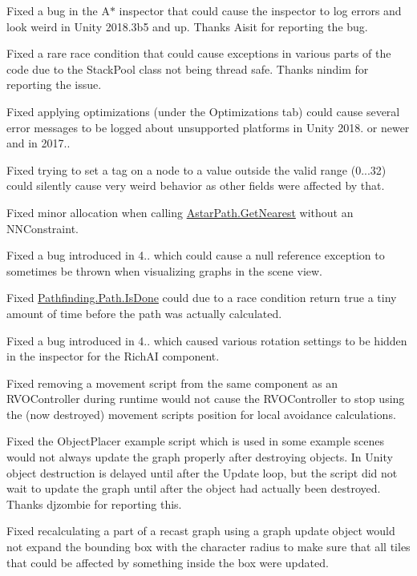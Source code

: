 \begin{DoxyItemize}
\begin{DoxyItemize}
\begin{DoxyItemize}
\item Fixed a bug in the A$\ast$ inspector that could cause the inspector to log errors and look weird in Unity 2018.\+3b5 and up. Thanks Aisit for reporting the bug.
\item Fixed a rare race condition that could cause exceptions in various parts of the code due to the Stack\+Pool class not being thread safe. Thanks nindim for reporting the issue.
\item Fixed applying optimizations (under the Optimizations tab) could cause several error messages to be logged about unsupported platforms in Unity 2018. or newer and in 2017..
\item Fixed trying to set a tag on a node to a value outside the valid range (0...32) could silently cause very weird behavior as other fields were affected by that.
\item Fixed minor allocation when calling \mbox{\hyperlink{class_astar_path_a7d49736e7a25f4cf9fc24bdbec862359}{Astar\+Path.\+Get\+Nearest}} without an N\+N\+Constraint.
\item Fixed a bug introduced in 4.. which could cause a null reference exception to sometimes be thrown when visualizing graphs in the scene view.
\item Fixed \mbox{\hyperlink{class_pathfinding_1_1_path_aedc88f47f6da4068be44b37bd3e93769}{Pathfinding.\+Path.\+Is\+Done}} could due to a race condition return true a tiny amount of time before the path was actually calculated.
\item Fixed a bug introduced in 4.. which caused various rotation settings to be hidden in the inspector for the Rich\+AI component.
\item Fixed removing a movement script from the same component as an R\+V\+O\+Controller during runtime would not cause the R\+V\+O\+Controller to stop using the (now destroyed) movement script\textquotesingle{}s position for local avoidance calculations.
\item Fixed the Object\+Placer example script which is used in some example scenes would not always update the graph properly after destroying objects. In Unity object destruction is delayed until after the Update loop, but the script did not wait to update the graph until after the object had actually been destroyed. Thanks djzombie for reporting this.
\item Fixed recalculating a part of a recast graph using a graph update object would not expand the bounding box with the character radius to make sure that all tiles that could be affected by something inside the box were updated.

\end{DoxyItemize}
\end{DoxyItemize}
\end{DoxyItemize}
